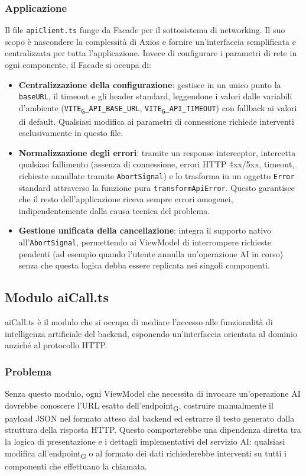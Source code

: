 \documentclass[11pt,a4paper]{article}
\newcommand{\gls}[1]{#1\textsubscript{G}}
\begin{document}
\subsubsection{Applicazione}
Il file \texttt{apiClient.ts} funge da Facade per il sottosistema di networking. Il suo scopo è nascondere la complessità di Axios e fornire un'interfaccia semplificata e centralizzata per tutta l'applicazione. Invece di configurare i parametri di rete in ogni componente, il Facade si occupa di:
\begin{itemize}
\item \textbf{Centralizzazione della configurazione}: gestisce in un unico punto la \texttt{baseURL}, il timeout e gli header standard, leggendone i valori dalle variabili d'ambiente (\texttt{\gls{VITE}\_API\_BASE\_URL}, \texttt{\gls{VITE}\_API\_TIMEOUT}) con fallback ai valori di default. Qualsiasi modifica ai parametri di connessione richiede interventi esclusivamente in questo file.
\item \textbf{Normalizzazione degli errori}: tramite un response interceptor, intercetta qualsiasi fallimento (assenza di connessione, errori HTTP 4xx/5xx, timeout, richieste annullate tramite \texttt{AbortSignal}) e lo trasforma in un oggetto \texttt{Error} standard attraverso la funzione pura \texttt{transformApiError}. Questo garantisce che il resto dell'applicazione riceva sempre errori omogenei, indipendentemente dalla causa tecnica del problema.
\item \textbf{Gestione unificata della cancellazione}: integra il supporto nativo all'\texttt{AbortSignal}, permettendo ai ViewModel di interrompere richieste pendenti (ad esempio quando l'utente annulla un'operazione AI in corso) senza che questa logica debba essere replicata nei singoli componenti.
\end{itemize}

\subsection{Modulo aiCall.ts}
aiCall.ts è il modulo che si occupa di mediare l'accesso alle funzionalità di intelligenza artificiale del backend, esponendo un'interfaccia orientata al dominio anziché al protocollo HTTP.

\subsubsection{Problema}
Senza questo modulo, ogni ViewModel che necessita di invocare un'operazione AI dovrebbe conoscere l'URL esatto dell'\gls{endpoint}, costruire manualmente il payload JSON nel formato atteso dal backend ed estrarre il testo generato dalla struttura della risposta HTTP. Questo comporterebbe una dipendenza diretta tra la logica di presentazione e i dettagli implementativi del servizio AI: qualsiasi modifica all'\gls{endpoint} o al formato dei dati richiederebbe interventi su tutti i componenti che effettuano la chiamata.
\end{document}
